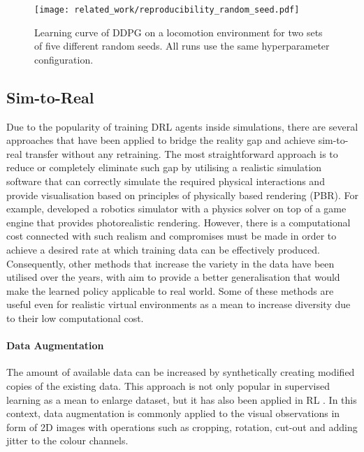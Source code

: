 \begin{figure}[hb]
    \centering
    \texttt{[image: related\_work/reproducibility\_random\_seed.pdf]}
    \caption{Learning curve of DDPG on a locomotion environment for two sets of five different random seeds. All runs use the same hyperparameter configuration.~\protect\cite{henderson_deep_2018}}
    \label{fig:reproducibility_random_seed}
\end{figure}

\newpage

\subsection{Sim-to-Real}\label{subsec:sim2real}

Due to the popularity of training DRL agents inside simulations, there are several approaches that have been applied to bridge the reality gap and achieve sim-to-real transfer without any retraining. The most straightforward approach is to reduce or completely eliminate such gap by utilising a realistic simulation software that can correctly simulate the required physical interactions and provide visualisation based on principles of physically based rendering (PBR). For example, \citet{iqbal_toward_2020} developed a robotics simulator with a physics solver on top of a game engine that provides photorealistic rendering. However, there is a computational cost connected with such realism and compromises must be made in order to achieve a desired rate at which training data can be effectively produced. Consequently, other methods that increase the variety in the data have been utilised over the years, with aim to provide a better generalisation that would make the learned policy applicable to real world. Some of these methods are useful even for realistic virtual environments as a mean to increase diversity due to their low computational cost.

\paragraph{Data Augmentation} The amount of available data can be increased by synthetically creating modified copies of the existing data. This approach is not only popular in supervised learning as a mean to enlarge dataset, but it has also been applied in RL \cite{zhang_towards_2015, laskin_reinforcement_2020, zhan_framework_2020}. In this context, data augmentation is commonly applied to the visual observations in form of 2D images with operations such as cropping, rotation, cut-out and adding jitter to the colour channels.

